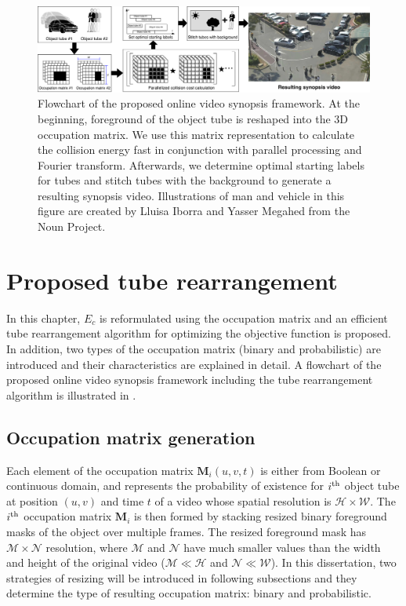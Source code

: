 \documentclass[11pt]{hyu_thesis}
\begin{document}
\begin{figure}
\includegraphics[width=\linewidth]{flowchart.pdf}
\caption{Flowchart of the proposed online video synopsis framework. At the beginning, foreground of the object tube is reshaped into the 3D occupation matrix. We use this matrix representation to calculate the collision energy fast in conjunction with parallel processing and Fourier transform. Afterwards, we determine optimal starting labels for tubes and stitch tubes with the background to generate a resulting synopsis video. Illustrations of man and vehicle in this figure are created by Lluisa Iborra and Yasser Megahed from the Noun Project.}
\label{fig:flowchart}
\end{figure}

\chapter{Proposed tube rearrangement}
\label{sec:proposed}
In this chapter, $E_c$ is reformulated using the occupation matrix and an efficient tube rearrangement algorithm for optimizing the objective function is proposed. In addition, two types of the occupation matrix (binary and probabilistic) are introduced and their characteristics are explained in detail. A flowchart of the proposed online video synopsis framework including the tube rearrangement algorithm is illustrated in .

\section{Occupation matrix generation}
\label{sec:proposed:occ}
Each element of the occupation matrix $\textbf{M}_i (u,v,t)$ is either from Boolean or continuous domain, and represents the probability of existence for $i^{\rm{th}}$ object tube at position $(u,v)$ and time $t$ of a video whose spatial resolution is $\mathcal{H} \times \mathcal{W}$. The $i^{\rm{th}}$ occupation matrix $\textbf{M}_i$ is then formed by stacking resized binary foreground masks of the object over multiple frames. The resized foreground mask has $\mathcal{M} \times \mathcal{N}$ resolution, where $\mathcal{M}$ and $\mathcal{N}$ have much smaller values than the width and height of the original video ($\mathcal{M} \ll \mathcal{H}$ and $\mathcal{N} \ll \mathcal{W}$). In this dissertation, two strategies of resizing will be introduced in following subsections and they determine the type of resulting occupation matrix: binary and probabilistic.
\end{document}
